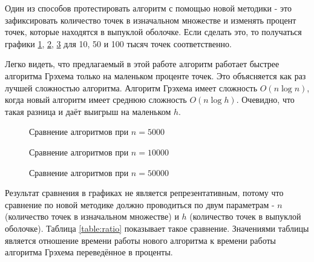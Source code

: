 Один из способов протестировать алгоритм с помощью новой методики - это зафиксировать количество точек в изначальном множестве и изменять процент точек, которые находятся в выпуклой оболочке. Если сделать это, то получаться графики \ref{img:comparison_5000}, \ref{img:comparison_10000}, \ref{img:comparison_50000} для 10, 50 и 100 тысяч точек соответственно.

Легко видеть, что предлагаемый в этой работе алгоритм работает быстрее алгоритма Грэхема только на маленьком проценте точек. Это объясняется как раз лучшей сложностью алгоритма. Алгоритм Грэхема имеет сложность $O(n \log n)$, когда новый алгоритм имеет среднюю сложность $O(n \log h)$. Очевидно, что такая разница и даёт выигрыш на маленьком $h$.

\begin{figure}
	\centering
	
	\caption{Сравнение алгоритмов при $n = 5000$}
	\label{img:comparison_5000}
\end{figure}

\begin{figure}
	\centering
	
	\caption{Сравнение алгоритмов при $n = 10000$}
	\label{img:comparison_10000}
\end{figure}

\begin{figure}
	\centering
	
	\caption{Сравнение алгоритмов при $n = 50000$}
	\label{img:comparison_50000}
\end{figure}

Результат сравнения в графиках не является репрезентативным, потому что сравнение по новой методике должно проводиться по двум параметрам - $n$ (количество точек в изначальном множестве) и $h$ (количество точек в выпуклой оболочке). Таблица \ref{table:ratio} показывает такое сравнение. Значениями таблицы является отношение времени работы нового алгоритма к времени работы алгоритма Грэхема переведённое в проценты.


